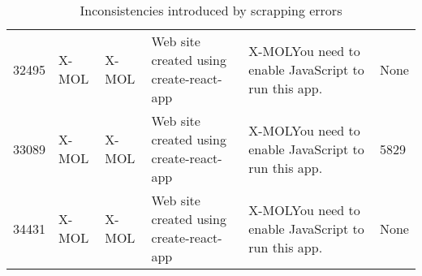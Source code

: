 \begin{landscape}
\begin{table}
{\begin{tabular}{llp{2cm}lll}
32495 & X-MOL              & X-MOL                & Web site created using create-react-app & X-MOLYou need to enable JavaScript to run this app. & None       \\
33089 & X-MOL              & X-MOL                & Web site created using create-react-app & X-MOLYou need to enable JavaScript to run this app. & 5829 \\
34431 & X-MOL              & X-MOL                & Web site created using create-react-app & X-MOLYou need to enable JavaScript to run this app. & None      
\end{tabular}
}
\caption{Inconsistencies introduced by scrapping errors}
\label{tab:04_xmol_inconsistencies}
\end{table}
\end{landscape}